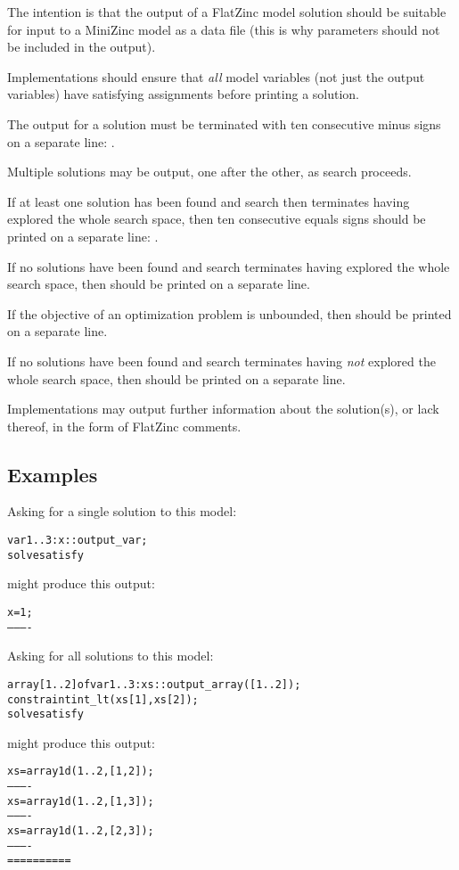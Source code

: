 \documentclass[a4paper]{article}
\begin{document}
The intention is that the output of a FlatZinc model solution should be
suitable for input to a MiniZinc model as a data file (this is why
parameters should not be included in the output).

Implementations should ensure that \emph{all} model variables (not
just the output variables) have satisfying assignments before printing a
solution.

The output for a solution must be terminated with ten consecutive
minus signs on a separate line: \fz{----------}.

Multiple solutions may be output, one after the other, as search
proceeds.

If at least one solution has been found and search then terminates
having explored the whole search space, then ten
consecutive equals signs should be printed on a separate line:
\fz{==========}.

If no solutions have been found and search terminates having explored
the whole search space, then  should be
printed on a separate line.

If the objective of an optimization problem is unbounded, then
 should be printed on a separate line.

If no solutions have been found and search terminates having
\emph{not} explored the whole search space, then
 should be printed on a separate line.

Implementations may output further information about the solution(s),
or lack thereof, in the form of FlatZinc comments.

\subsection*{Examples}

Asking for a single solution to this model:
\begin{alltt}
var 1..3: x :: output_var;
solve satisfy
\end{alltt}
might produce this output:
\begin{alltt}
x = 1;
----------
\end{alltt}

Asking for all solutions to this model:
\begin{alltt}
array [1..2] of var 1..3: xs :: output_array([1..2]);
constraint int_lt(xs[1], xs[2]);    % x[1] < x[2].
solve satisfy
\end{alltt}
might produce this output:
\begin{alltt}
xs = array1d(1..2, [1, 2]);
----------
xs = array1d(1..2, [1, 3]);
----------
xs = array1d(1..2, [2, 3]);
----------
==========
\end{alltt}
\end{document}
